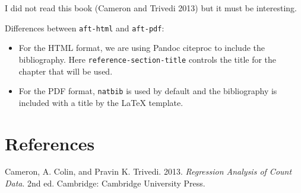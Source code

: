 \documentclass[
  11pts,
]{article}
\providecommand{\tightlist}{%
  \setlength{\itemsep}{0pt}\setlength{\parskip}{0pt}}\usepackage{longtable,booktabs,array}
\newlength{\cslhangindent}
\newenvironment{CSLReferences}[2] %
 {\begin{list}{}{%
  \setlength{\itemindent}{0pt}
  \setlength{\leftmargin}{0pt}
  \setlength{\parsep}{0pt}
  \ifodd #1
   \setlength{\leftmargin}{\cslhangindent}
   \setlength{\itemindent}{-1\cslhangindent}
  \fi
  \setlength{\itemsep}{#2\baselineskip}}}
 {\end{list}}
\begin{document}
I did not read this book (Cameron and Trivedi 2013) but it must be
interesting.

Differences between \texttt{aft-html} and \texttt{aft-pdf}:

\begin{itemize}
\tightlist
\item
  For the HTML format, we are using Pandoc citeproc to include the
  bibliography. Here \texttt{reference-section-title} controls the title
  for the chapter that will be used.
\item
  For the PDF format, \texttt{natbib} is used by default and the
  bibliography is included with a title by the LaTeX template.
\end{itemize}

\section*{References}\label{bibliography}

\label{refs}
\begin{CSLReferences}{1}{0}
Cameron, A. Colin, and Pravin K. Trivedi. 2013. \emph{Regression
Analysis of Count Data}. 2nd ed. Cambridge: Cambridge University Press.

\end{CSLReferences}
\end{document}
